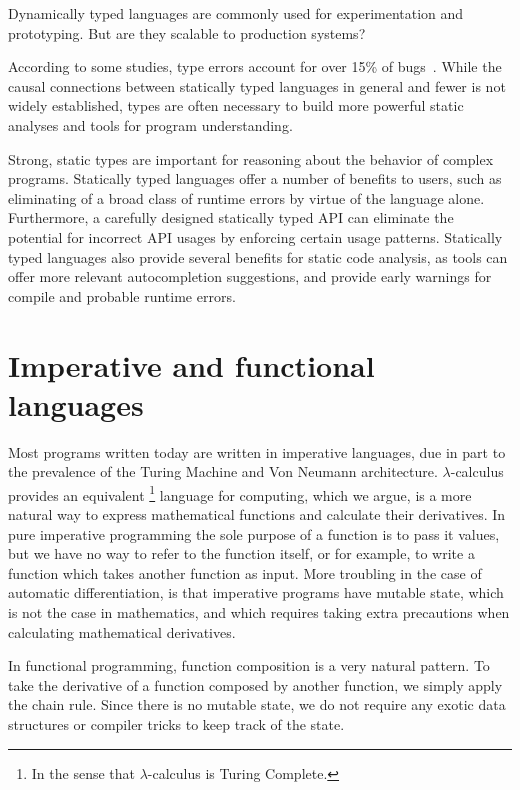 \documentclass[12pt,initial,twoside,maitrise]{dms}
\numberwithin{equation}{section}
\numberwithin{table}{chapter}
\numberwithin{figure}{chapter}
\begin{document}
Dynamically typed languages are commonly used for experimentation and prototyping. But are they scalable to production systems?

According to some studies, type errors account for over 15\% of bugs~\cite{gao2017type}. While the causal connections between statically typed languages in general and fewer is not widely established, types are often necessary to build more powerful static analyses and tools for program understanding.

Strong, static types are important for reasoning about the behavior of complex programs. Statically typed languages offer a number of benefits to users, such as eliminating of a broad class of runtime errors by virtue of the language alone. Furthermore, a carefully designed statically typed API can eliminate the potential for incorrect API usages by enforcing certain usage patterns. Statically typed languages also provide several benefits for static code analysis, as tools can offer more relevant autocompletion suggestions, and provide early warnings for compile and probable runtime errors.

\section{Imperative and functional languages}

Most programs written today are written in imperative languages, due in part to the prevalence of the Turing Machine and Von Neumann architecture. $\lambda$-calculus provides an equivalent \footnote{In the sense that $\lambda$-calculus is Turing Complete.} language for computing, which we argue, is a more natural way to express mathematical functions and calculate their derivatives. In pure imperative programming the sole purpose of a function is to pass it values, but we have no way to refer to the function itself, or for example, to write a function which takes another function as input. More troubling in the case of automatic differentiation, is that imperative programs have mutable state, which is not the case in mathematics, and which requires taking extra precautions when calculating mathematical derivatives.

In functional programming, function composition is a very natural pattern. To take the derivative of a function composed by another function, we simply apply the chain rule. Since there is no mutable state, we do not require any exotic data structures or compiler tricks to keep track of the state.
\end{document}
